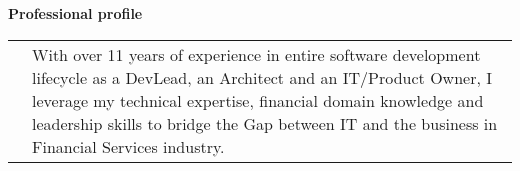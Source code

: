 \textbf{Professional profile}
\\
\begin{tabular}{p{}|p{}}
&With over 11 years of experience in entire software development lifecycle as a DevLead, an Architect and an IT/Product Owner, I leverage my technical expertise, financial domain knowledge and leadership skills to bridge the Gap between IT and the business in Financial Services industry.\\
\end{tabular}